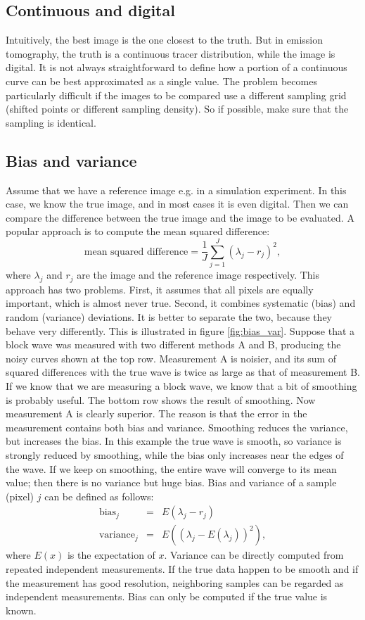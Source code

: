\subsection{Continuous and digital}
Intuitively, the best image is the one closest to the truth. But in emission
tomography, the truth is a continuous tracer distribution, while the image is
digital. It is not always straightforward to define how a portion of a
continuous curve can be best approximated as a single value. The problem
becomes particularly difficult if the images to be compared use a different
sampling grid (shifted points or different sampling density). So if possible,
make sure that the sampling is identical.

\subsection{Bias and variance}
Assume that we have a reference image e.g. in a simulation experiment. In
this case, we know the true image, and in most cases it is even digital. Then
we can compare the difference between the true image and the image to be
evaluated. A popular approach is to compute the mean squared difference:
\begin{equation}
  \mbox{mean squared difference} = \frac{1}{J} \sum_{j=1}^J (\lambda_j - r_j)^2,
\end{equation}
where $\lambda_j$ and $r_j$ are the image and the reference image
respectively.  This approach has two problems. First, it assumes that
all pixels are equally important, which is almost never true. Second,
it combines systematic (bias) and random (variance) deviations. It is
better to separate the two, because they behave very differently. This
is illustrated in figure \ref{fig:bias_var}. Suppose that a block wave
was measured with two different methods A and B, producing the noisy
curves shown at the top row. Measurement A is noisier, and its sum of
squared differences with the true wave is twice as large as that of
measurement B. If we know that we are measuring a block wave, we know
that a bit of smoothing is probably useful. The bottom row shows the
result of smoothing. Now measurement A is clearly superior. The reason
is that the error in the measurement contains both bias and
variance. Smoothing reduces the variance, but increases the bias. In
this example the true wave is smooth, so variance is strongly reduced
by smoothing, while the bias only increases near the edges of the
wave.  If we keep on smoothing, the entire wave will converge to its
mean value; then there is no variance but huge bias. Bias and variance
of a sample (pixel) $j$ can be defined as follows:
\begin{align}
  \mbox{bias}_j     & = & E(\lambda_j - r_j)\\
  \mbox{variance}_j & = & E\left((\lambda_j - E(\lambda_j))^2 \right),
\end{align}
where $E(x)$ is the expectation of $x$. Variance can be directly computed from
repeated independent measurements. If the true data happen to be smooth and if
the measurement has good resolution, neighboring samples can be regarded as
independent measurements. Bias can only be computed if the true value is known.

